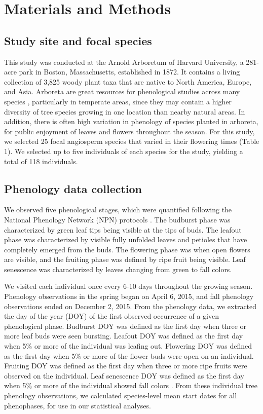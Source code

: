 \documentclass{article}
\begin{document}
\section* {Materials and Methods}
\subsection*{Study site and focal species}
This study was conducted at the Arnold Arboretum of Harvard University, a 281-acre park in Boston, Massachusetts, established in 1872. It contains a living collection of 3,825 woody plant taxa that are native to North America, Europe, and Asia. Arboreta are great resources for phenological studies across many species \citep [e.g., ][]{primack2009a}, particularly in temperate areas, since they may contain a higher diversity of tree species growing in one location than nearby natural areas. In addition, there is often high variation in phenology of species planted in arboreta, for public enjoyment of leaves and flowers throughout the season. For this study, we selected 25 focal angiosperm species that varied in their flowering times (Table 1). We selected up to five individuals of each species for the study, yielding a total of 118 individuals.

\subsection*{Phenology data collection}
We observed five phenological stages, which were quantified following the National Phenology Network (NPN) protocols \citep[for a full description see][]{denny2014}. The budburst phase was characterized by green leaf tips being visible at the tips of buds. The leafout phase was characterized by visible fully unfolded leaves and petioles that have completely emerged from the buds. The flowering phase was when open flowers are visible, and the fruiting phase was defined by ripe fruit being visible. Leaf senescence was characterized by leaves changing from green to fall colors. 
\par We visited each individual once every 6-10 days throughout the growing season. Phenology observations in the spring began on April 6, 2015, and fall phenology observations ended on December 2, 2015.
From the phenology data, we extracted the day of the year (DOY) of the first observed occurrence of a given phenological phase. Budburst DOY was defined as the first day when three or more leaf buds were seen bursting. Leafout DOY was defined as the first day when 5\% or more of the individual was leafing out. Flowering DOY was defined as the first day when 5\% or more of the flower buds were open on an individual. Fruiting DOY was defined as the first day when three or more ripe fruits were observed on the individual. Leaf senescence DOY was defined as the first day when 5\% or more of the individual showed fall colors \citep{denny2014}. 
From these individual tree phenology observations, we calculated species-level mean start dates for all phenophases, for use in our statistical analyses. 
\end{document}
